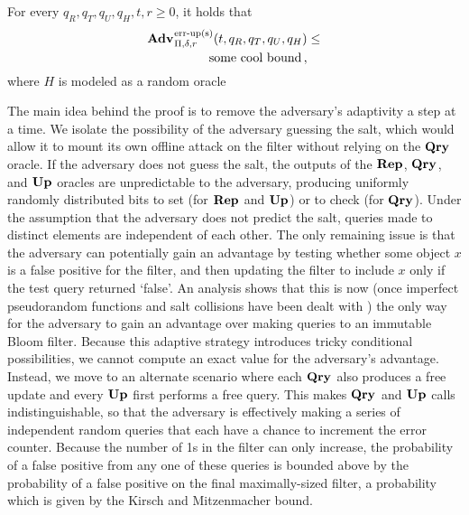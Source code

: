 \begin{theorem}\label{thm:sbf-erreps}
  For every $q_R, q_T, q_U, q_H, t, r\geq 0$, it holds that
  \begin{eqnarray*}
    \begin{aligned}
      \Adv{\erreps}_{\Pi,\delta,r}(t,q_R, q_T, q_U, q_H) &\leq \\
          \text{some cool bound} \,,
    \end{aligned}
\end{eqnarray*}
where $H$ is modeled as a random oracle
\end{theorem}

%
The main idea behind the proof is to remove the adversary's
adaptivity a step at a time. We isolate the possibility of the adversary
guessing the salt, which would allow it to mount its own offline attack on the
filter without relying on the $\textup{\textbf{Qry}}\hspace{0.5pt}$ oracle. If the adversary does not guess
the salt, the outputs of the $\textup{\textbf{Rep}}\hspace{0.5pt}$, $\textup{\textbf{Qry}}\hspace{0.5pt}$, and $\textup{\textbf{Up}}\hspace{0.5pt}$ oracles are
unpredictable to the adversary, producing uniformly randomly distributed bits to
set (for $\textup{\textbf{Rep}}\hspace{0.5pt}$ and $\textup{\textbf{Up}}\hspace{0.5pt}$) or to check (for $\textup{\textbf{Qry}}\hspace{0.5pt}$). Under the assumption
that the adversary does not predict the salt, queries made to distinct elements
are independent of each other. The only remaining issue is that the adversary
can potentially gain an advantage by testing whether some object $x$ is a false
positive for the filter, and then updating the filter to include $x$ only if the
test query returned `false'.
%
An analysis shows that this is now (once imperfect
pseudorandom functions and salt collisions have been dealt with )
%
the only way for the adversary to gain an advantage over making queries to an
immutable Bloom filter. Because this adaptive strategy introduces tricky
conditional possibilities, we cannot compute an exact value for the adversary's
advantage.  Instead, we move to an alternate scenario where each $\textup{\textbf{Qry}}\hspace{0.5pt}$ also
produces a free update and every $\textup{\textbf{Up}}\hspace{0.5pt}$ first performs a free query. This makes
$\textup{\textbf{Qry}}\hspace{0.5pt}$ and $\textup{\textbf{Up}}\hspace{0.5pt}$ calls indistinguishable, so that the adversary is effectively
making a series of independent random queries that each have a chance to
increment the error counter. Because the number of 1s in the filter can only
increase, the probability of a false positive from any one of these queries is
bounded above by the probability of a false positive on the final
maximally-sized filter, a probability which is given by the Kirsch and
Mitzenmacher bound.


